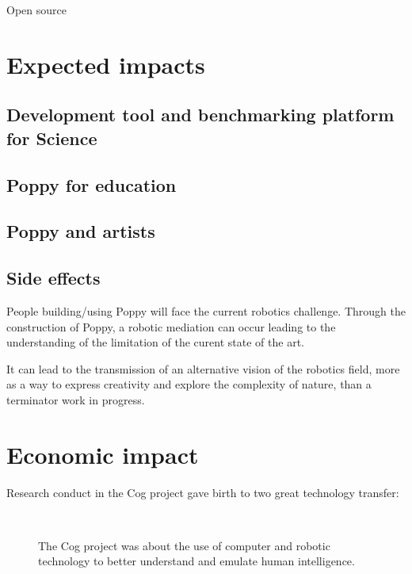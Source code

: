 Open source


\section{Expected impacts} %

\subsection{Development tool and benchmarking platform for Science} %

\subsection{Poppy for education} %

\subsection{Poppy and artists} %


\subsection{Side effects} %
People building/using Poppy will face the current robotics challenge. Through the construction of Poppy, a robotic mediation can occur leading to the understanding of the limitation of the curent state of the art.

It can lead to the transmission of an alternative vision of the robotics field, more as a way to express creativity and explore the complexity of nature, than a terminator work in progress.




\section{Economic impact} %

Research conduct in the Cog project gave birth to two great technology transfer:

\begin{figure}[t]
\centering
    \hfil
     \\
    \hfil
    \caption{The Cog project was about the use of computer and robotic technology to better understand and emulate human intelligence.}

\end{figure}


